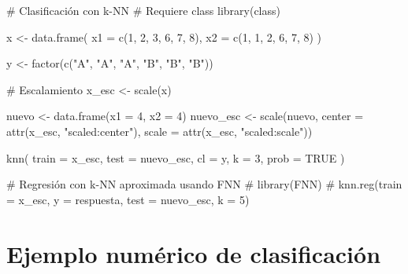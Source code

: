 \documentclass[
  spanish,
  11pt,
  letterpaper,
  DIV=11,
  numbers=noendperiod]{scrreprt}
\newenvironment{Shaded}{\begin{snugshade}}{\end{snugshade}}
\newcommand{\AttributeTok}[1]{\textcolor[rgb]{0.40,0.45,0.13}{#1}}
\newcommand{\CommentTok}[1]{\textcolor[rgb]{0.37,0.37,0.37}{#1}}
\newcommand{\ConstantTok}[1]{\textcolor[rgb]{0.56,0.35,0.01}{#1}}
\newcommand{\DecValTok}[1]{\textcolor[rgb]{0.68,0.00,0.00}{#1}}
\newcommand{\FunctionTok}[1]{\textcolor[rgb]{0.28,0.35,0.67}{#1}}
\newcommand{\NormalTok}[1]{\textcolor[rgb]{0.00,0.23,0.31}{#1}}
\newcommand{\OtherTok}[1]{\textcolor[rgb]{0.00,0.23,0.31}{#1}}
\newcommand{\StringTok}[1]{\textcolor[rgb]{0.13,0.47,0.30}{#1}}
\theoremstyle{definition}
\theoremstyle{plain}
\theoremstyle{definition}
\theoremstyle{remark}
\begin{document}
\begin{Shaded}
\begin{Highlighting}[]
\CommentTok{\# Clasificación con k{-}NN}
\CommentTok{\# Requiere class}
\FunctionTok{library}\NormalTok{(class)}

\NormalTok{x }\OtherTok{\textless{}{-}} \FunctionTok{data.frame}\NormalTok{(}
  \AttributeTok{x1 =} \FunctionTok{c}\NormalTok{(}\DecValTok{1}\NormalTok{, }\DecValTok{2}\NormalTok{, }\DecValTok{3}\NormalTok{, }\DecValTok{6}\NormalTok{, }\DecValTok{7}\NormalTok{, }\DecValTok{8}\NormalTok{),}
  \AttributeTok{x2 =} \FunctionTok{c}\NormalTok{(}\DecValTok{1}\NormalTok{, }\DecValTok{1}\NormalTok{, }\DecValTok{2}\NormalTok{, }\DecValTok{6}\NormalTok{, }\DecValTok{7}\NormalTok{, }\DecValTok{8}\NormalTok{)}
\NormalTok{)}

\NormalTok{y }\OtherTok{\textless{}{-}} \FunctionTok{factor}\NormalTok{(}\FunctionTok{c}\NormalTok{(}\StringTok{"A"}\NormalTok{, }\StringTok{"A"}\NormalTok{, }\StringTok{"A"}\NormalTok{, }\StringTok{"B"}\NormalTok{, }\StringTok{"B"}\NormalTok{, }\StringTok{"B"}\NormalTok{))}

\CommentTok{\# Escalamiento}
\NormalTok{x\_esc }\OtherTok{\textless{}{-}} \FunctionTok{scale}\NormalTok{(x)}

\NormalTok{nuevo }\OtherTok{\textless{}{-}} \FunctionTok{data.frame}\NormalTok{(}\AttributeTok{x1 =} \DecValTok{4}\NormalTok{, }\AttributeTok{x2 =} \DecValTok{4}\NormalTok{)}
\NormalTok{nuevo\_esc }\OtherTok{\textless{}{-}} \FunctionTok{scale}\NormalTok{(nuevo,}
                   \AttributeTok{center =} \FunctionTok{attr}\NormalTok{(x\_esc, }\StringTok{"scaled:center"}\NormalTok{),}
                   \AttributeTok{scale =} \FunctionTok{attr}\NormalTok{(x\_esc, }\StringTok{"scaled:scale"}\NormalTok{))}

\FunctionTok{knn}\NormalTok{(}
  \AttributeTok{train =}\NormalTok{ x\_esc,}
  \AttributeTok{test =}\NormalTok{ nuevo\_esc,}
  \AttributeTok{cl =}\NormalTok{ y,}
  \AttributeTok{k =} \DecValTok{3}\NormalTok{,}
  \AttributeTok{prob =} \ConstantTok{TRUE}
\NormalTok{)}

\CommentTok{\# Regresión con k{-}NN aproximada usando FNN}
\CommentTok{\# library(FNN)}
\CommentTok{\# knn.reg(train = x\_esc, y = respuesta, test = nuevo\_esc, k = 5)}
\end{Highlighting}
\end{Shaded}

\section{Ejemplo numérico de
clasificación}\label{ejemplo-numuxe9rico-de-clasificaciuxf3n}
\end{document}
